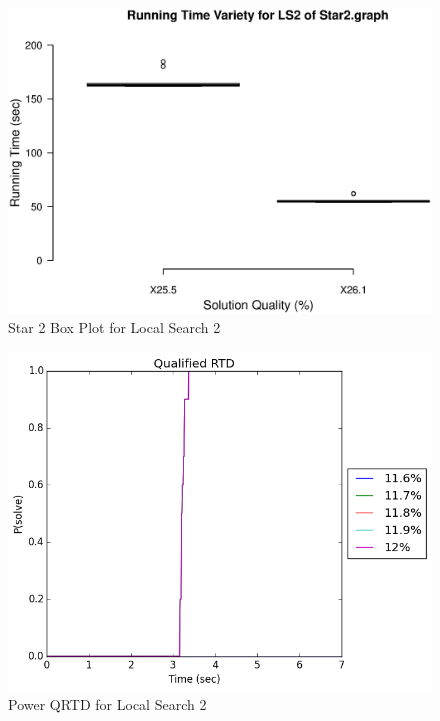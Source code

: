 \documentclass{sig-alternate-05-2015}
\begin{document}
\begin{figure}
\centering
\caption{Star 2 Box Plot for Local Search 2}
\includegraphics[scale=0.33]{Star2LS2_boxplot.eps}
\end{figure}

\begin{figure}
\centering
\caption{Power QRTD for Local Search 2}
\includegraphics[scale=0.4]{PowerLS2_qrtd_graph.png}
\end{figure}
\end{document}
